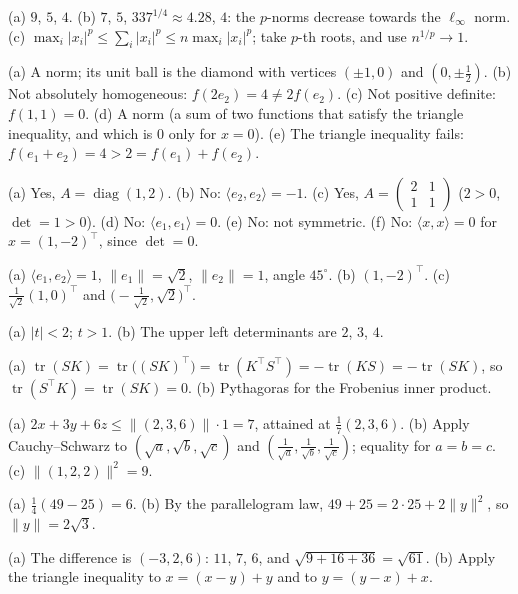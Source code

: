 \documentclass[11pt]{article}
\theoremstyle{definition}
\newcommand{\norm}[1]{\lVert #1 \rVert}
\newcommand{\ip}[2]{\langle #1, #2 \rangle}
\DeclareMathOperator{\tr}{tr}
\DeclareMathOperator{\diag}{diag}
\begin{document}
\begin{description}[leftmargin=0pt, itemsep=0.3em]
    \item[\ref{pr:norms-compute}.] (a) $9$, $5$, $4$. (b) $7$, $5$, $337^{1/4} \approx 4.28$, $4$: the $p$-norms decrease towards the $\ell_\infty$ norm. (c) $\max_i |x_i|^p \leq \sum_i |x_i|^p \leq n \max_i |x_i|^p$; take $p$-th roots, and use $n^{1/p} \to 1$.
    \item[\ref{pr:which-norms}.] (a) A norm; its unit ball is the diamond with vertices $(\pm 1, 0)$ and $(0, \pm\frac{1}{2})$. (b) Not absolutely homogeneous: $f(2e_2) = 4 \neq 2f(e_2)$. (c) Not positive definite: $f(1, 1) = 0$. (d) A norm (a sum of two functions that satisfy the triangle inequality, and which is $0$ only for $x = 0$). (e) The triangle inequality fails: $f(e_1 + e_2) = 4 > 2 = f(e_1) + f(e_2)$.
    \item[\ref{pr:which-ip}.] (a) Yes, $A = \diag(1, 2)$. (b) No: $\ip{e_2}{e_2} = -1$. (c) Yes, $A = \begin{pmatrix} 2 & 1 \\ 1 & 1 \end{pmatrix}$ ($2 > 0$, $\det = 1 > 0$). (d) No: $\ip{e_1}{e_1} = 0$. (e) No: not symmetric. (f) No: $\ip{x}{x} = 0$ for $x = (1, -2)^\top$, since $\det = 0$.
    \item[\ref{pr:ip-gram}.] (a) $\ip{e_1}{e_2} = 1$, $\norm{e_1} = \sqrt{2}$, $\norm{e_2} = 1$, angle $45^\circ$. (b) $(1, -2)^\top$. (c) $\frac{1}{\sqrt{2}}(1, 0)^\top$ and $\big(-\frac{1}{\sqrt{2}}, \sqrt{2}\big)^\top$.
    \item[\ref{pr:spd-param}.] (a) $|t| < 2$; $t > 1$. (b) The upper left determinants are $2$, $3$, $4$.
    \item[\ref{pr:frobenius-ip}.] (a) $\tr(SK) = \tr\big((SK)^\top\big) = \tr(K^\top S^\top) = -\tr(KS) = -\tr(SK)$, so $\tr(S^\top K) = \tr(SK) = 0$. (b) Pythagoras for the Frobenius inner product.
    \item[\ref{pr:cs-apps}.] (a) $2x + 3y + 6z \leq \norm{(2, 3, 6)} \cdot 1 = 7$, attained at $\frac{1}{7}(2, 3, 6)$. (b) Apply Cauchy--Schwarz to $(\sqrt{a}, \sqrt{b}, \sqrt{c})$ and $(\frac{1}{\sqrt{a}}, \frac{1}{\sqrt{b}}, \frac{1}{\sqrt{c}})$; equality for $a = b = c$. (c) $\norm{(1, 2, 2)}^2 = 9$.
    \item[\ref{pr:polarization}.] (a) $\frac{1}{4}(49 - 25) = 6$. (b) By the parallelogram law, $49 + 25 = 2 \cdot 25 + 2\norm{y}^2$, so $\norm{y} = 2\sqrt{3}$.
    \item[\ref{pr:dist}.] (a) The difference is $(-3, 2, 6)$: $11$, $7$, $6$, and $\sqrt{9 + 16 + 36} = \sqrt{61}$. (b) Apply the triangle inequality to $x = (x - y) + y$ and to $y = (y - x) + x$.

\end{description}
\end{document}
